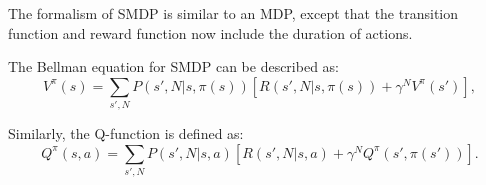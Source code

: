 The formalism of SMDP is similar to an MDP, except that the transition function and reward function
now include the duration of actions. 




The Bellman equation for SMDP can be described as:
\begin{equation}
    V^{\pi}(s) = \sum_{s', N}P(s', N|s, \pi(s))[R(s', N|s, \pi(s)) + \gamma^N V^{\pi}(s')],
\end{equation}

Similarly, the Q-function is defined as:
\begin{equation}
    Q^{\pi}(s, a) = \sum_{s', N}P(s', N|s, a)[R(s', N|s, a) + \gamma^N Q^{\pi}(s', \pi(s'))].
    \label{eq:Q}
\end{equation}


